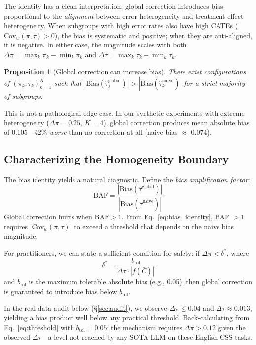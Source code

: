 \documentclass[11pt,a4paper]{article}
\newtheorem{proposition}{Proposition}
\newcommand{\Cov}{\mathrm{Cov}}
\begin{document}
The identity has a clean interpretation: global correction introduces bias proportional to the \emph{alignment} between error heterogeneity and treatment effect heterogeneity.
When subgroups with high error rates also have high CATEs ($\Cov_w(\pi,\tau) > 0$), the bias is systematic and positive; when they are anti-aligned, it is negative.
In either case, the magnitude scales with both $\Delta\pi = \max_k \pi_k - \min_k \pi_k$ and $\Delta\tau = \max_k \tau_k - \min_k \tau_k$.

\begin{proposition}[Global correction can increase bias]
\label{prop:hurts}
There exist configurations of $(\pi_k, \tau_k)_{k=1}^K$ such that $|\text{Bias}(\hat{\tau}_k^{\text{global}})| > |\text{Bias}(\hat{\tau}_k^{\text{naive}})|$ for a strict majority of subgroups.
\end{proposition}

This is not a pathological edge case.
In our synthetic experiments with extreme heterogeneity ($\Delta\pi = 0.25$, $K=4$), global correction produces mean absolute bias of 0.105---42\% \emph{worse} than no correction at all (naive bias $\approx$ 0.074).

\subsection{Characterizing the Homogeneity Boundary}

The bias identity yields a natural diagnostic.
Define the \emph{bias amplification factor}:
\begin{equation}
\text{BAF} = \frac{|\text{Bias}(\hat{\tau}^{\text{global}})|}{|\text{Bias}(\hat{\tau}^{\text{naive}})|}
\end{equation}
Global correction hurts when $\text{BAF} > 1$.
From Eq.~\eqref{eq:bias_identity}, BAF $> 1$ requires $|\Cov_w(\pi,\tau)|$ to exceed a threshold that depends on the naive bias magnitude.

For practitioners, we can state a sufficient condition for safety: if $\Delta\pi < \delta^*$, where
\begin{equation}
\delta^* = \frac{b_{\text{tol}}}{\Delta\tau \cdot |f(\bar{C})|}
\label{eq:threshold}
\end{equation}
and $b_{\text{tol}}$ is the maximum tolerable absolute bias (e.g., 0.05), then global correction is guaranteed to introduce bias below $b_{\text{tol}}$.

In the real-data audit below (\S\ref{sec:audit}), we observe $\Delta\pi \leq 0.04$ and $\Delta\tau \approx 0.013$, yielding a bias product well below any practical threshold.
Back-calculating from Eq.~\eqref{eq:threshold} with $b_{\text{tol}} = 0.05$: the mechanism requires $\Delta\pi > 0.12$ given the observed $\Delta\tau$---a level not reached by any SOTA LLM on these English CSS tasks.
\end{document}
